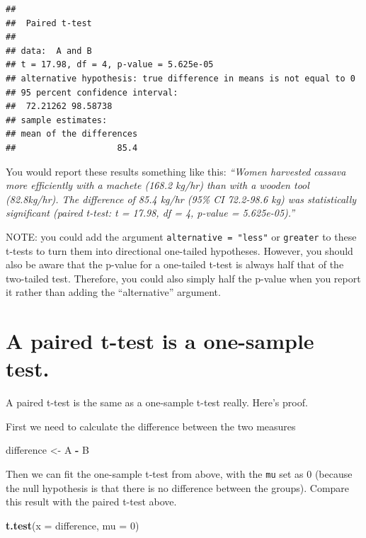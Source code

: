 \documentclass[
  a4paperpaper,
]{book}
\newenvironment{Shaded}{\begin{snugshade}}{\end{snugshade}}
\newcommand{\DataTypeTok}[1]{\textcolor[rgb]{0.13,0.29,0.53}{#1}}
\newcommand{\DecValTok}[1]{\textcolor[rgb]{0.00,0.00,0.81}{#1}}
\newcommand{\KeywordTok}[1]{\textcolor[rgb]{0.13,0.29,0.53}{\textbf{#1}}}
\newcommand{\NormalTok}[1]{#1}
\newcommand{\OperatorTok}[1]{\textcolor[rgb]{0.81,0.36,0.00}{\textbf{#1}}}
\newcommand{\StringTok}[1]{\textcolor[rgb]{0.31,0.60,0.02}{#1}}
\begin{document}
\begin{verbatim}
## 
## 	Paired t-test
## 
## data:  A and B
## t = 17.98, df = 4, p-value = 5.625e-05
## alternative hypothesis: true difference in means is not equal to 0
## 95 percent confidence interval:
##  72.21262 98.58738
## sample estimates:
## mean of the differences 
##                    85.4
\end{verbatim}

You would report these results something like this: \emph{``Women harvested cassava more efficiently with a machete (168.2 kg/hr) than with a wooden tool (82.8kg/hr). The difference of 85.4 kg/hr (95\% CI 72.2-98.6 kg) was statistically significant (paired t-test: t = 17.98, df = 4, p-value = 5.625e-05).''}

NOTE: you could add the argument \texttt{alternative\ =\ "less"} or \texttt{greater} to these t-tests to turn them into directional one-tailed hypotheses. However, you should also be aware that the p-value for a one-tailed t-test is always half that of the two-tailed test. Therefore, you could also simply half the p-value when you report it rather than adding the ``alternative'' argument.

\hypertarget{a-paired-t-test-is-a-one-sample-test.}{%
\section{A paired t-test is a one-sample test.}\label{a-paired-t-test-is-a-one-sample-test.}}

A paired t-test is the same as a one-sample t-test really. Here's proof.

First we need to calculate the difference between the two measures

\begin{Shaded}
\begin{Highlighting}[]
\NormalTok{difference \textless{}{-}}\StringTok{ }\NormalTok{A }\OperatorTok{{-}}\StringTok{ }\NormalTok{B}
\end{Highlighting}
\end{Shaded}

Then we can fit the one-sample t-test from above, with the \texttt{mu} set as 0 (because the null hypothesis is that there is no difference between the groups). Compare this result with the paired t-test above.

\begin{Shaded}
\begin{Highlighting}[]
\KeywordTok{t.test}\NormalTok{(}\DataTypeTok{x =}\NormalTok{ difference, }\DataTypeTok{mu =} \DecValTok{0}\NormalTok{)}
\end{Highlighting}
\end{Shaded}
\end{document}
